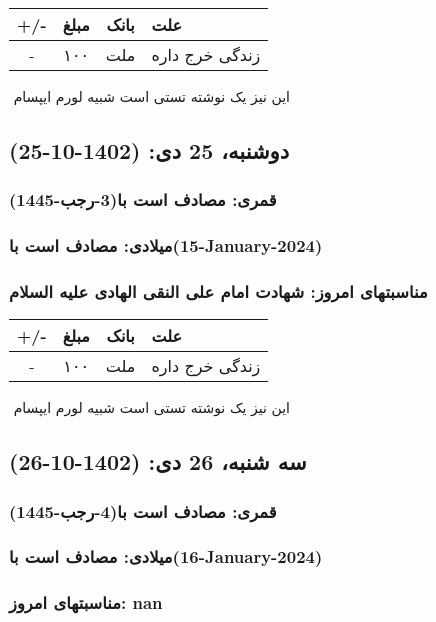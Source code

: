 \documentclass{article}
\newcommand{\rnote}[1]{\marginpar{\textcolor{color}{\StrSubstitute{\##1}{ }{\_}}}}
\newcommand{\myRow}[4]{
    #1 & #2 & #3 & #4 \\ \hline
}
\begin{document}
\begin{tabular}{ | c | c | c | p{5cm} |}
    \hline
    \myRow{ +/- }{مبلغ}{بانک}{علت}
    \myRow{-}{۱۰۰}{ملت}{زندگی خرج داره}
\end{tabular}
\newline
\newline

‌
\rnote{تست}
این نیز یک نوشته تستی است شبیه لورم ایپسام




\newpage
{}
\textcolor{color}{
\section{ دوشنبه، 25 دی: (1402-10-25) }
\subsubsection*{قمری: مصادف است با(3-رجب-1445)} 
\subsubsection*{میلادی: مصادف است با(15-January-2024)}
\subsubsection*{مناسبتهای امروز: شهادت امام علی النقی الهادی علیه السلام}
}


\begin{tabular}{ | c | c | c | p{5cm} |}
    \hline
    \myRow{ +/- }{مبلغ}{بانک}{علت}
    \myRow{-}{۱۰۰}{ملت}{زندگی خرج داره}
\end{tabular}
\newline
\newline

‌
\rnote{تست}
این نیز یک نوشته تستی است شبیه لورم ایپسام




\newpage
{}
\textcolor{color}{
\section{ سه شنبه، 26 دی: (1402-10-26) }
\subsubsection*{قمری: مصادف است با(4-رجب-1445)} 
\subsubsection*{میلادی: مصادف است با(16-January-2024)}
\subsubsection*{مناسبتهای امروز: nan}
}
\end{document}
